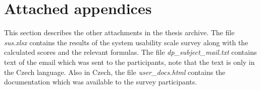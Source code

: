 \documentclass[nolof,digital]{fithesis3}
\begin{document}
\section{Attached appendices}
This section describes the other attachments in the thesis archive. The file \emph{sus.xlsx} contains the results of the system usability scale survey along with the calculated scores and the relevant formulas. The file \emph{dp\_subject\_mail.txt} contains text of the email which was sent to the participants, note that the text is only in the Czech language. Also in Czech, the file \emph{user\_docs.html} contains the documentation which was available to the survey participants.
\end{document}
